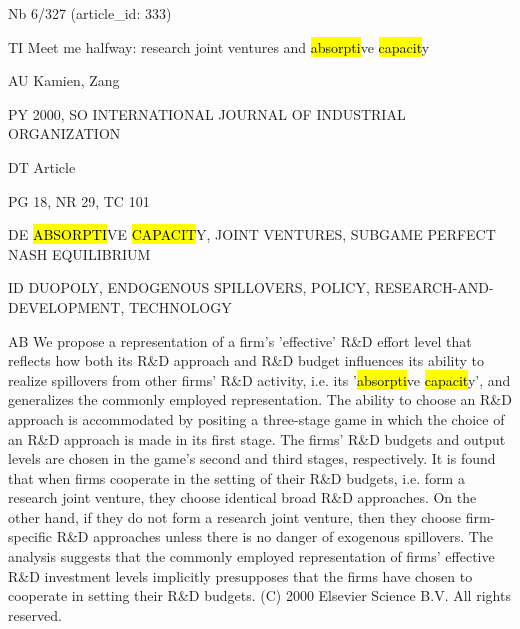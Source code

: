 \documentclass[a4paper]{article}
\begin{document}
\vspace*{-2cm}
Nb \tabto{0cm}6/327 (article\_id: 333)\par
TI \tabto{0cm}Meet me halfway: research joint ventures and \hl{absorpti}ve \hl{capacit}y\par
AU \tabto{0cm}Kamien, Zang\par
PY \tabto{0cm}2000, SO INTERNATIONAL JOURNAL OF INDUSTRIAL ORGANIZATION\par
DT \tabto{0cm}Article\par
PG \tabto{0cm}18, NR 29, TC 101\par
DE \tabto{0cm}\hl{ABSORPTI}VE \hl{CAPACIT}Y, JOINT VENTURES, SUBGAME PERFECT NASH EQUILIBRIUM\par
ID \tabto{0cm}DUOPOLY, ENDOGENOUS SPILLOVERS, POLICY, RESEARCH-AND-DEVELOPMENT, TECHNOLOGY\par
AB \tabto{0cm}We propose a representation of a firm's 'effective' R\&D effort level that reflects how both its R\&D approach and R\&D budget influences its ability to realize spillovers from other firms' R\&D activity, i.e. its '\hl{absorpti}ve \hl{capacit}y', and generalizes the commonly employed representation. The ability to choose an R\&D approach is accommodated by positing a three-stage game in which the choice of an R\&D approach is made in its first stage. The firms' R\&D budgets and output levels are chosen in the game's second and third stages, respectively. It is found that when firms cooperate in the setting of their R\&D budgets, i.e. form a research joint venture, they choose identical broad R\&D approaches. On the other hand, if they do not form a research joint venture, then they choose firm-specific R\&D approaches unless there is no danger of exogenous spillovers. The analysis suggests that the commonly employed representation of firms' effective R\&D investment levels implicitly presupposes that the firms have chosen to cooperate in setting their R\&D budgets. (C) 2000 Elsevier Science B.V. All rights reserved.\par
\clearpage
\end{document}
